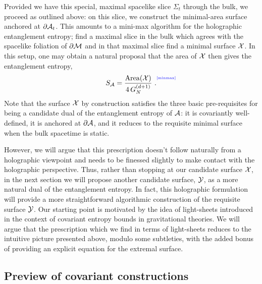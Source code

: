 \documentclass[12pt]{article}
\def\p{\partial}
\def\CA{{\cal A}}
\def\CX{{\cal X}}
\def\CY{{\cal Y}}
\def\CSig{{\Sigma}}
\def\p{\partial}
\def\p{\partial}
\def\Label#1{\label{#1}%
{ \color{blue}{\smash{\hbox to0pt{\raise2ex\hbox{\tiny[#1]}\hss}}}}}
\def\bdy{\p{\cal M}}
\def\Lms{\CY}
\def\Xms{\CX}
\def\Sms{\CSig}
\def\rA{\CA}
\def\brA{\p \CA}
\def\area#1{{\rm Area}(#1)}
\begin{document}
Provided we have this special, maximal spacelike slice $\Sms_t$
through the bulk, we proceed as outlined above: on this slice, we
construct the minimal-area surface anchored at $\brA_t$. This
amounts to a mini-max algorithm for the holographic entanglement
entropy; find a maximal slice in the bulk which agrees with the
spacelike foliation of $\bdy$ and in that maximal slice find a
minimal surface $\Xms$. In this setup, one may obtain a natural
proposal that the area of $\Xms$ then gives the entanglement
entropy,
%
\begin{equation}
S_\rA = {\area{\Xms}  \over 4 \, G_N^{(d+1)} } \ .
\Label{minmax}
\end{equation}
%
Note that the surface $\Xms$ by construction satisfies the three basic pre-requisites for being a candidate dual of the entanglement entropy of $\rA$:  it is covariantly well-defined, it is anchored at $\brA$, and it reduces to the requisite minimal surface when the bulk spacetime is static.

However, we will argue that this prescription doesn't follow naturally from a holographic viewpoint and needs to be finessed slightly to make contact with the holographic perspective.
Thus, rather than stopping at our candidate surface $\Xms$, in the next section we will propose another candidate surface, $\Lms$, as a more natural dual of the entanglement entropy.
In fact, this holographic formulation will provide a more straightforward algorithmic construction of the requisite surface $\Lms$. Our starting point is motivated by the idea of light-sheets introduced in the context  of covariant entropy bounds in gravitational theories. We will argue that the prescription which we find in terms of light-sheets reduces to the intuitive picture presented above, modulo some subtleties, with the added bonus of providing an explicit equation for the extremal surface.


\subsection{Preview of covariant constructions}
\label{covEEprev}
\end{document}

